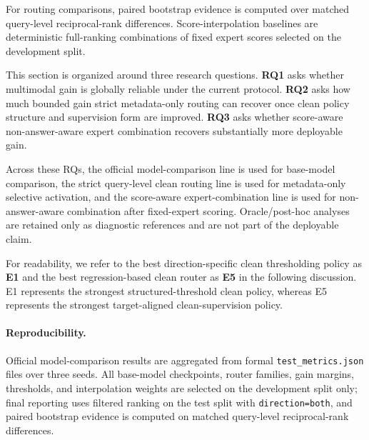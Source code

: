 \documentclass[11pt]{article}
\begin{document}
For routing comparisons, paired bootstrap evidence is computed over matched query-level reciprocal-rank differences. Score-interpolation baselines are deterministic full-ranking combinations of fixed expert scores selected on the development split.

This section is organized around three research questions. \textbf{RQ1} asks whether multimodal gain is globally reliable under the current protocol. \textbf{RQ2} asks how much bounded gain strict metadata-only routing can recover once clean policy structure and supervision form are improved. \textbf{RQ3} asks whether score-aware non-answer-aware expert combination recovers substantially more deployable gain.

Across these RQs, the official model-comparison line is used for base-model comparison, the strict query-level clean routing line is used for metadata-only selective activation, and the score-aware expert-combination line is used for non-answer-aware combination after fixed-expert scoring. Oracle/post-hoc analyses are retained only as diagnostic references and are not part of the deployable claim.

For readability, we refer to the best direction-specific clean thresholding policy as \textbf{E1} and the best regression-based clean router as \textbf{E5} in the following discussion. E1 represents the strongest structured-threshold clean policy, whereas E5 represents the strongest target-aligned clean-supervision policy.

\paragraph{Reproducibility.}
Official model-comparison results are aggregated from formal \texttt{test\_metrics.json} files over three seeds. All base-model checkpoints, router families, gain margins, thresholds, and interpolation weights are selected on the development split only; final reporting uses filtered ranking on the test split with \texttt{direction=both}, and paired bootstrap evidence is computed on matched query-level reciprocal-rank differences.
\end{document}
